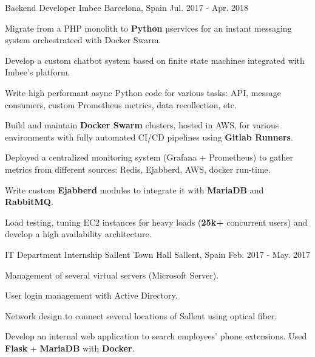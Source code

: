 \begin{cventries}
  \cventry
    {Backend Developer} %
    {Imbee} %
    {Barcelona, Spain} %
    {Jul. 2017 - Apr. 2018} %
    {
      \begin{cvitems} %
        \item {Migrate from a PHP monolith to \textbf{Python} µservices for an instant messaging system orchestrateed with Docker Swarm.}
        \item {Develop a custom chatbot system based on finite state machines integrated with Imbee's platform.}
        \item {Write high performant async Python code for various tasks: API, message consumers, custom Prometheus metrics, data recollection, etc.}
        \item {Build and maintain \textbf{Docker Swarm} clusters, hosted in AWS, for various environments with fully automated CI/CD pipelines using \textbf{Gitlab Runners}.}
        \item {Deployed a centralized monitoring system (Grafana + Prometheus) to gather metrics from different sources: Redis, Ejabberd, AWS, docker run-time.}
        \item {Write custom \textbf{Ejabberd} modules to integrate it with \textbf{MariaDB} and \textbf{RabbitMQ}.}
        \item {Load testing, tuning EC2 instances for heavy loads (\textbf{25k+} concurrent users) and develop a high availability architecture.}
      \end{cvitems}
    }

  \cventry
    {IT Department Internship} %
    {Sallent Town Hall} %
    {Sallent, Spain} %
    {Feb. 2017 - May. 2017} %
    {
      \begin{cvitems} %
        \item {Management of several virtual servers (Microsoft Server).}
        \item {User login management with Active Directory.}
        \item {Network design to connect several locations of Sallent using optical fiber.}
        \item {Develop an internal web application to search employees' phone extensions. Used \textbf{Flask} + \textbf{MariaDB} with \textbf{Docker}.}
      \end{cvitems}
    }

\end{cventries}
